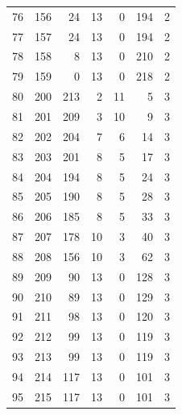 \documentclass[a4paper,twoside,12pt]{book}
\begin{document}
\begin{appendices}
\begin{table}
\begin{tabular}{lrrrrrr}
		76  &    156 &        24 &        13 &               0 &             194 &         2 \\
		77  &    157 &        24 &        13 &               0 &             194 &         2 \\
		78  &    158 &         8 &        13 &               0 &             210 &         2 \\
		79  &    159 &         0 &        13 &               0 &             218 &         2 \\
		80  &    200 &       213 &         2 &              11 &               5 &         3 \\
		81  &    201 &       209 &         3 &              10 &               9 &         3 \\
		82  &    202 &       204 &         7 &               6 &              14 &         3 \\
		83  &    203 &       201 &         8 &               5 &              17 &         3 \\
		84  &    204 &       194 &         8 &               5 &              24 &         3 \\
		85  &    205 &       190 &         8 &               5 &              28 &         3 \\
		86  &    206 &       185 &         8 &               5 &              33 &         3 \\
		87  &    207 &       178 &        10 &               3 &              40 &         3 \\
		88  &    208 &       156 &        10 &               3 &              62 &         3 \\
		89  &    209 &        90 &        13 &               0 &             128 &         3 \\
		90  &    210 &        89 &        13 &               0 &             129 &         3 \\
		91  &    211 &        98 &        13 &               0 &             120 &         3 \\
		92  &    212 &        99 &        13 &               0 &             119 &         3 \\
		93  &    213 &        99 &        13 &               0 &             119 &         3 \\
		94  &    214 &       117 &        13 &               0 &             101 &         3 \\
		95  &    215 &       117 &        13 &               0 &             101 &         3 \\

\end{tabular}
\end{table}
\end{appendices}
\end{document}
